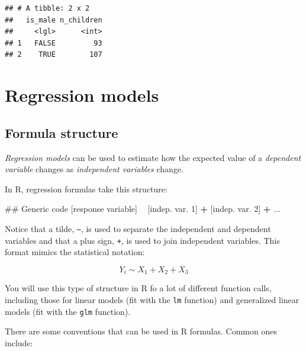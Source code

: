 \documentclass[]{book}
\makeatletter
\newenvironment{Shaded}{\begin{snugshade}}{\end{snugshade}}
\newcommand{\DecValTok}[1]{\textcolor[rgb]{0.00,0.00,0.81}{#1}}
\newcommand{\StringTok}[1]{\textcolor[rgb]{0.31,0.60,0.02}{#1}}
\newcommand{\OperatorTok}[1]{\textcolor[rgb]{0.81,0.36,0.00}{\textbf{#1}}}
\newcommand{\NormalTok}[1]{#1}
\newenvironment{kframe}{%
\medskip{}
\setlength{\fboxsep}{.8em}
 \def\at@end@of@kframe{}%
 \ifinner\ifhmode%
  \def\at@end@of@kframe{\end{minipage}}%
  \begin{minipage}{\columnwidth}%
 \fi\fi%
 \def\FrameCommand##1{\hskip\@totalleftmargin \hskip-\fboxsep
 \colorbox{shadecolor}{##1}\hskip-\fboxsep
     \hskip-\linewidth \hskip-\@totalleftmargin \hskip\columnwidth}%
 \MakeFramed {\advance\hsize-\width
   \@totalleftmargin\z@ \linewidth\hsize
   \@setminipage}}%
 {\par\unskip\endMakeFramed%
 \at@end@of@kframe}
\renewenvironment{Shaded}{\begin{kframe}}{\end{kframe}}
\theoremstyle{definition}
\theoremstyle{definition}
\theoremstyle{definition}
\theoremstyle{remark}
\makeatother
\begin{document}
\begin{verbatim}
## # A tibble: 2 x 2
##   is_male n_children
##     <lgl>      <int>
## 1   FALSE         93
## 2    TRUE        107
\end{verbatim}

\section{Regression models}\label{regression-models}

\subsection{Formula structure}\label{formula-structure}

\emph{Regression models} can be used to estimate how the expected value
of a \emph{dependent variable} changes as \emph{independent variables}
change. \medskip

In R, regression formulas take this structure:

\begin{Shaded}
\begin{Highlighting}[]
\NormalTok{## Generic code}
\NormalTok{[response variable] }\OperatorTok{~}\StringTok{ }\NormalTok{[indep. var. }\DecValTok{1}\NormalTok{] }\OperatorTok{+}\StringTok{  }\NormalTok{[indep. var. }\DecValTok{2}\NormalTok{] }\OperatorTok{+}\StringTok{ }\NormalTok{...}
\end{Highlighting}
\end{Shaded}

Notice that a tilde, \texttt{\textasciitilde{}}, is used to separate the
independent and dependent variables and that a plus sign, \texttt{+}, is
used to join independent variables. This format mimics the statistical
notation:

\[
Y_i \sim X_1 + X_2 + X_3
\]

You will use this type of structure in R fo a lot of different function
calls, including those for linear models (fit with the \texttt{lm}
function) and generalized linear models (fit with the \texttt{glm}
function).

There are some conventions that can be used in R formulas. Common ones
include:
\end{document}
